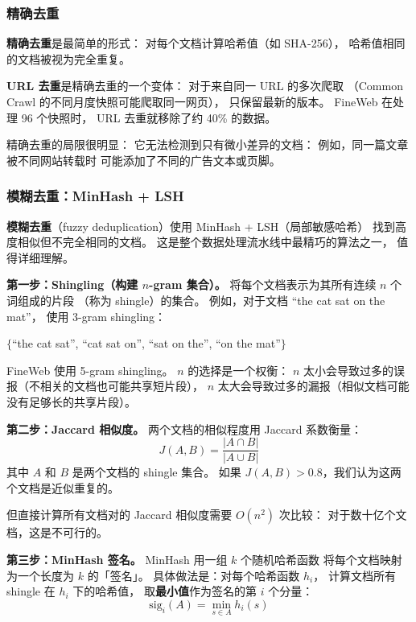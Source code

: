 \subsubsection{精确去重}

\textbf{精确去重}是最简单的形式：
对每个文档计算哈希值（如 SHA-256），
哈希值相同的文档被视为完全重复。

\textbf{URL 去重}是精确去重的一个变体：
对于来自同一 URL 的多次爬取
（Common Crawl 的不同月度快照可能爬取同一网页），
只保留最新的版本。
FineWeb 在处理 96 个快照时，
URL 去重就移除了约 40\% 的数据。

精确去重的局限很明显：
它无法检测到只有微小差异的文档：
例如，同一篇文章被不同网站转载时
可能添加了不同的广告文本或页脚。

\subsubsection{模糊去重：MinHash + LSH}

\textbf{模糊去重}（fuzzy deduplication）使用
MinHash + LSH（局部敏感哈希）
找到高度相似但不完全相同的文档。
这是整个数据处理流水线中最精巧的算法之一，
值得详细理解。

\textbf{第一步：Shingling（构建 $n$-gram 集合）。}
将每个文档表示为其所有连续 $n$ 个词组成的片段
（称为 shingle）的集合。
例如，对于文档 “the cat sat on the mat”，
使用 3-gram shingling：

\begin{center}
\small
$\{$“the cat sat”, “cat sat on”, “sat on the”, “on the mat”$\}$
\end{center}

FineWeb 使用 5-gram shingling。
$n$ 的选择是一个权衡：
$n$ 太小会导致过多的误报（不相关的文档也可能共享短片段），
$n$ 太大会导致过多的漏报（相似文档可能没有足够长的共享片段）。

\textbf{第二步：Jaccard 相似度。}
两个文档的相似程度用 Jaccard 系数衡量：
\begin{equation}
  J(A, B) = \frac{|A \cap B|}{|A \cup B|}
\end{equation}
其中 $A$ 和 $B$ 是两个文档的 shingle 集合。
如果 $J(A, B) > 0.8$，我们认为这两个文档是近似重复的。

但直接计算所有文档对的 Jaccard 相似度需要 $O(n^2)$ 次比较：
对于数十亿个文档，这是不可行的。

\textbf{第三步：MinHash 签名。}
MinHash 用一组 $k$ 个随机哈希函数
将每个文档映射为一个长度为 $k$ 的「签名」。
具体做法是：对每个哈希函数 $h_i$，
计算文档所有 shingle 在 $h_i$ 下的哈希值，
取\textbf{最小值}作为签名的第 $i$ 个分量：
\begin{equation}
  \text{sig}_i(A) = \min_{s \in A} h_i(s)
\end{equation}

